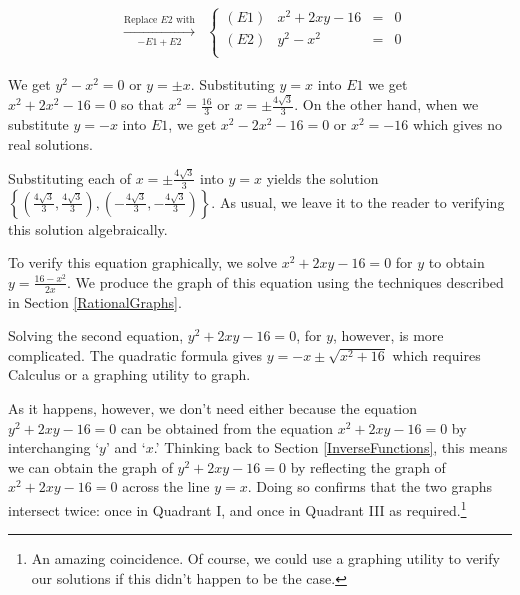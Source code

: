 \begin{ex}
\begin{enumerate}
\[\begin{array}{ccc}
&

\xrightarrow[\text{$-E1 + E2$}]{\text{Replace $E2$ with}}


&

\left\{\begin{array}{lrcr} (E1) &  x^2 +2xy -16 & = & 0 \\ (E2) & y^2 - x^2 & = & 0 \\ \end{array} \right.

\end{array} \]

We get $y^2 - x^2 = 0$ or $y = \pm x$.   Substituting $y=x$  into $E1$ we get $x^2+2x^2-16 = 0$ so that $x^2 = \frac{16}{3}$ or $x = \pm \frac{4 \sqrt{3}}{3}$.  On the other hand, when we substitute $y = -x$ into $E1$, we get $x^2 - 2x^2 - 16 = 0$ or $x^2 = -16$ which gives no real solutions.  

Substituting each of $x = \pm \frac{4 \sqrt{3}}{3}$ into $y=x$ yields the solution $\left\{\left(\frac{4 \sqrt{3}}{3},\frac{4 \sqrt{3}}{3}\right), \left(-\frac{4 \sqrt{3}}{3},-\frac{4 \sqrt{3}}{3}\right)\right\}$.  As usual, we leave it to the reader to verifying this solution algebraically.


To verify this equation graphically,  we solve $x^2 +2xy -16 = 0$ for $y$ to obtain $y = \frac{16 - x^2}{2x}$.  We produce the graph of this equation using the techniques described in  Section \ref{RationalGraphs}.  

Solving the second equation, $y^2 +2xy -16 = 0$, for $y$, however, is more complicated.  The quadratic formula  gives $y = -x \pm \sqrt{x^2+16}$ which requires Calculus or a graphing utility to graph.

As it happens, however, we don't need either because the equation $y^2+2xy-16 = 0$ can be obtained from the equation $x^2+2xy-16=0$ by interchanging `$y$' and `$x$.'  Thinking back to Section \ref{InverseFunctions}, this means we can obtain the graph of  $y^2+2xy-16 = 0$ by reflecting the graph of  $x^2+2xy-16 = 0$ across the line $y=x$.  Doing so confirms that the two graphs intersect twice: once in Quadrant I, and once in Quadrant III as required.\footnote{An amazing coincidence.  Of course, we could use a graphing utility to verify our solutions if this didn't happen to be the case.}

\begin{center}


\end{center}
\end{enumerate}
\end{ex}
